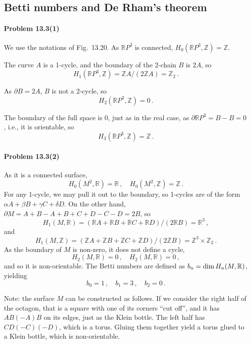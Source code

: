 \documentclass[a4paper,12pt]{article}
\newcommand{\problem}[1]{\paragraph{Problem #1}}
\begin{document}

\subsection{Betti numbers and De Rham's theorem}


\problem{13.3(1)} We use the notations of Fig.\ 13.20. As $\mathbb{R}P^3$ is connected, $H_0(\mathbb{R}P^3,\mathbb{Z}) = \mathbb{Z}$.

The curve $A$ is a 1-cycle, and the boundary of the 2-chain $B$ is $2A$, so
\[
 H_1(\mathbb{R}P^3,\mathbb{Z}) = \mathbb{Z} A / (2 \mathbb{Z} A) = \mathbb{Z}_2\,.
\]

As $\partial B = 2 A$, $B$ is not a 2-cycle, so
\[
 H_2(\mathbb{R}P^3,\mathbb{Z}) = 0\,.
\]

The boundary of the full space is 0, just as in the real case, as $\partial \mathbb{R}P^3 = B - B = 0$, i.e., it is orientable, so
\[
 H_3(\mathbb{R}P^3,\mathbb{Z}) = \mathbb{Z}\,.
\]


\problem{13.3(2)} As it is a connected surface,
\[
 H_0(M^2, \mathbb{R}) = \mathbb{R}\,,\quad
 H_0(M^2, \mathbb{Z}) = \mathbb{Z}\,.
\]
For any 1-cycle, we may pull it out to the boundary, so 1-cycles are of the form $\alpha A + \beta B + \gamma C + \delta D$. On the other hand, $\partial M = A + B - A + B + C + D - C - D = 2 B$, so
\[
 H_1(M, \mathbb{R}) = (\mathbb{R}A+\mathbb{R}B+\mathbb{R}C+\mathbb{R}D)/(2\mathbb{R}B) = \mathbb{R}^3\,,
\]
and
\[
 H_1(M, \mathbb{Z}) = (\mathbb{Z}A+\mathbb{Z}B+\mathbb{Z}C+\mathbb{Z}D)/(2\mathbb{Z}B) = \mathbb{Z}^3\times \mathbb{Z}_2\,.
\]
As the boundary of $M$ is non-zero, it does not define a cycle,
\[
 H_2(M, \mathbb{R})=0\,,\quad H_2(M, \mathbb{R}) =0\,,
\]
and so it is non-orientable. The Betti numbers are defined as $b_n = \mathop{\rm dim}H_n(M,\mathbb{R})$, yielding
\[
 b_0 = 1\,,\quad b_1=3\,,\quad b_2=0\,.
\]


Note: the surface $M$ can be constructed as follows. If we consider the right half of the octagon, that is a square with one of its corners ``cut off'', and it has $AB(-A)B$ on its edges, just as the Klein bottle. The left half has $CD(-C)(-D)$, which is a torus. Gluing them together yield a torus glued to a Klein bottle, which is non-orientable.
\end{document}
